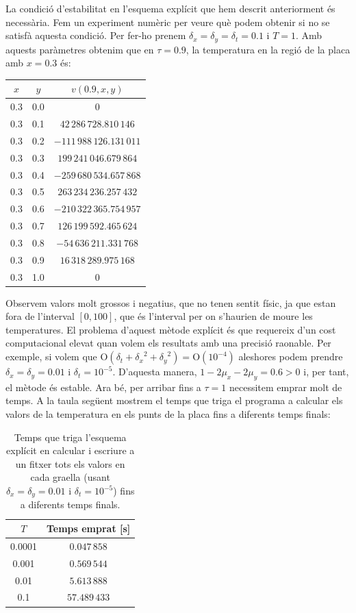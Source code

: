 \documentclass[10pt,a4paper]{article}
\renewcommand{\O}[1]{\mathrm{O}\left(#1\right)} %
\theoremstyle{definition}
\theoremstyle{remark}
\begin{document}
La condició d'estabilitat en l'esquema explícit que hem descrit anteriorment és necessària. Fem un experiment numèric per veure què podem obtenir si no se satisfà aquesta condició. Per fer-ho prenem $\delta_x=\delta_y=\delta_t=0.1$ i $T=1$. Amb aquests paràmetres obtenim que en $\tau=0.9$, la temperatura en la regió de la placa amb $x=0.3$ és:
\begin{table}[ht]
  \centering
  \begin{tabular}{|c|c|c|}
    \hline
    $x$ & $y$ & $v(0.9,x,y)$              \\ \hline\hline
    0.3 & 0.0 & 0                         \\
    0.3 & 0.1 & $42\,286\,728.810\,146$   \\
    0.3 & 0.2 & $-111\,988\,126.131\,011$ \\
    0.3 & 0.3 & $199\,241\,046.679\,864$  \\
    0.3 & 0.4 & $-259\,680\,534.657\,868$ \\
    0.3 & 0.5 & $263\,234\,236.257\,432$  \\
    0.3 & 0.6 & $-210\,322\,365.754\,957$ \\
    0.3 & 0.7 & $126\,199\,592.465\,624$  \\
    0.3 & 0.8 & $-54\,636\,211.331\,768$  \\
    0.3 & 0.9 & $16\,318\,289.975\,168$   \\
    0.3 & 1.0 & 0                         \\
    \hline
  \end{tabular}
\end{table}

Observem valors molt grossos i negatius, que no tenen sentit físic, ja que estan fora de l'interval $[0,100]$, que és l'interval per on s'haurien de moure les temperatures. El problema d'aquest mètode explícit és que requereix d'un cost computacional elevat quan volem els resultats amb una precisió raonable. Per exemple, si volem que $\O{\delta_t + {\delta_x}^2 + {\delta_y}^2} = \O{10^{-4}}$ aleshores podem prendre $\delta_x= \delta_y=0.01$ i $\delta_t=10^{-5}$. D'aquesta manera, $1-2\mu_x-2\mu_y = 0.6>0$ i, per tant, el mètode és estable. Ara bé, per arribar fins a $\tau=1$ necessitem emprar molt de temps. A la taula següent mostrem el temps que triga el programa a calcular els valors de la temperatura en els punts de la placa fins a diferents temps finals:
\begin{table}[ht]
  \centering
  \begin{tabular}{|c|c|}
    \hline
    $T$    & Temps emprat [s] \\ \hline\hline
    0.0001 & $0.047\,858$     \\
    0.001  & $0.569\,544$     \\
    0.01   & $5.613\,888$     \\
    0.1    & $57.489\,433$    \\
    \hline
  \end{tabular}
  \caption{Temps que triga l'esquema explícit en calcular i escriure a un fitxer tots els valors en cada graella (usant $\delta_x= \delta_y=0.01$ i $\delta_t=10^{-5}$) fins a diferents temps finals.}
\end{table}
\end{document}
